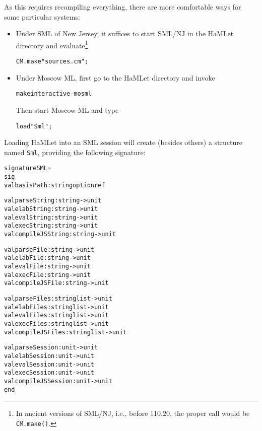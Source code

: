 \documentclass[twoside,titlepage]{article}
\begin{document}
As this requires recompiling everything, there are more comfortable ways for some particular systems:

\begin{itemize}

\item Under SML of New Jersey, it suffices to start SML/NJ in the HaMLet directory and evaluate\footnote{In ancient versions of SML/NJ, i.e., before 110.20, the proper call would be {\tt CM.make()}.}

\begin{quoting}
\begin{alltt}
CM.make "sources.cm";
\end{alltt}
\end{quoting}

\item Under Moscow ML, first go to the HaMLet directory and invoke

\begin{quoting}
\begin{alltt}
make interactive-mosml
\end{alltt}
\end{quoting}

Then start Moscow ML and type

\begin{quoting}
\begin{alltt}
load "Sml";
\end{alltt}
\end{quoting}

\end{itemize}

Loading HaMLet into an SML session will create (besides others) a structure named {\tt Sml}, providing the following signature:

\begin{quoting}
\begin{alltt}
signature SML =
sig
  val basisPath        : string option ref

  val parseString      : string -> unit
  val elabString       : string -> unit
  val evalString       : string -> unit
  val execString       : string -> unit
  val compileJSString  : string -> unit

  val parseFile        : string -> unit
  val elabFile         : string -> unit
  val evalFile         : string -> unit
  val execFile         : string -> unit
  val compileJSFile    : string -> unit

  val parseFiles       : string list -> unit
  val elabFiles        : string list -> unit
  val evalFiles        : string list -> unit
  val execFiles        : string list -> unit
  val compileJSFiles   : string list -> unit

  val parseSession     : unit -> unit
  val elabSession      : unit -> unit
  val evalSession      : unit -> unit
  val execSession      : unit -> unit
  val compileJSSession : unit -> unit
end
\end{alltt}
\end{quoting}
\end{document}
